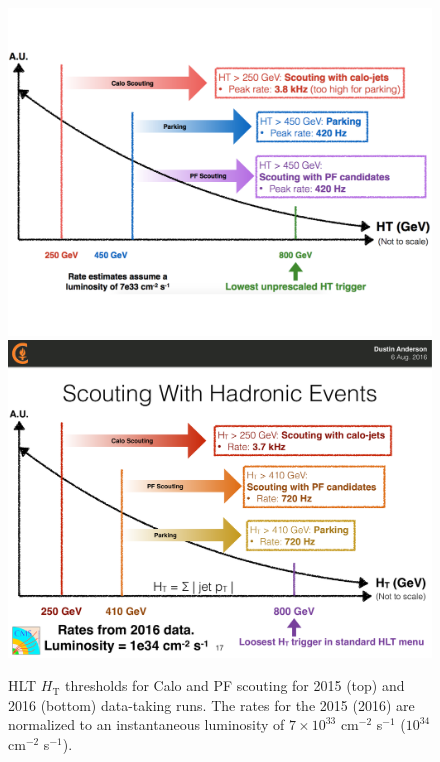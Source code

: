 \begin{figure}\centering
\includegraphics[width=.9\textwidth]{figs/cms/Scouting2015.pdf}\\
\includegraphics[width=.9\textwidth]{figs/cms/Scouting2016.pdf}
\caption{HLT $H_\mathrm{T}$ thresholds for Calo and PF scouting for
  2015 (top) and 2016 (bottom) data-taking runs. The
  rates for the 2015 (2016) are normalized to an instantaneous luminosity
  of $7\times 10^{33}$ cm$^{-2}$ s$^{-1}$ ($10^{34}$ cm$^{-2}$
  s$^{-1}$). \label{fig:DataScouting}}
\end{figure}

